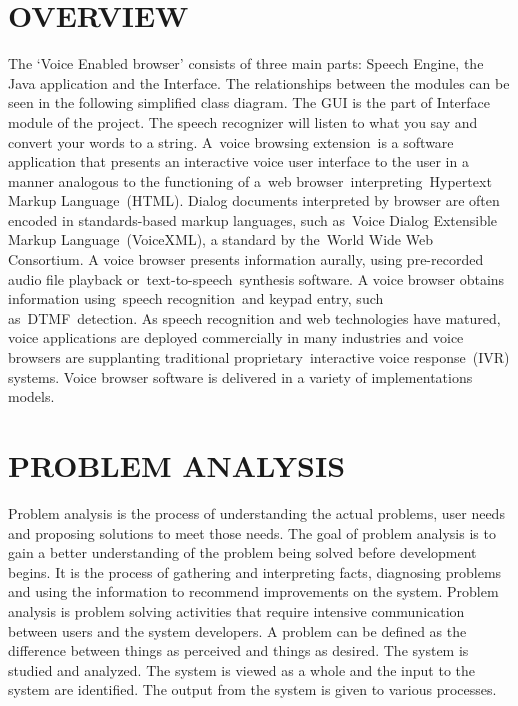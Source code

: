 \documentclass[11pt]{report} %
\begin{document}
\section{OVERVIEW}
\label{sec:OVERVIEW}
The ‘Voice Enabled browser’ consists of three main parts: Speech Engine, the Java application and the Interface. The relationships between the modules can be seen in the following simplified class diagram. The GUI is the part of Interface module of the project.  The speech recognizer will listen to what you say and convert your words to a string.
A voice browsing extension is a software application that presents an interactive voice user interface to the user in a manner analogous to the functioning of a web browser interpreting Hypertext Markup Language (HTML). Dialog documents interpreted by browser are often encoded in standards-based markup languages, such as Voice Dialog Extensible Markup Language (VoiceXML), a standard by the World Wide Web Consortium.
A voice browser presents information aurally, using pre-recorded audio file playback or text-to-speech synthesis software. A voice browser obtains information using speech recognition and keypad entry, such as DTMF detection.
As speech recognition and web technologies have matured, voice applications are deployed commercially in many industries and voice browsers are supplanting traditional proprietary interactive voice response (IVR) systems. Voice browser software is delivered in a variety of implementations models.


\section{PROBLEM ANALYSIS}
\label{sec:PROBLEM ANALYSIS}

Problem analysis is the process of understanding the actual problems, user needs and proposing solutions to meet those needs. The goal of problem analysis is to gain a better understanding of the problem being solved before development begins. It is the process of gathering and interpreting facts, diagnosing problems and using the information to recommend improvements on the system. Problem analysis is problem solving activities that require intensive communication between users and the system developers. A problem can be defined as the difference between things as perceived and things as desired. The system is studied and analyzed. The system is viewed as a whole and the input to the system are identified. The output from the system is given to various processes.
\end{document}
